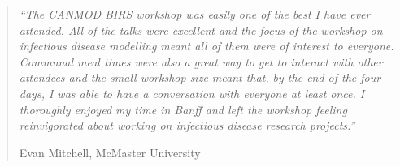\begin{quote}
\textit{``The CANMOD BIRS workshop was easily one of the best I have ever attended. All of the talks were excellent and the focus of the workshop on infectious disease modelling meant all of them were of interest to everyone. Communal meal times were also a great way to get to interact with other attendees and the small workshop size meant that, by the end of the four days, I was able to have a conversation with everyone at least once. I thoroughly enjoyed my time in Banff and left the workshop feeling reinvigorated about working on infectious disease research projects.''}

\hfill Evan Mitchell, McMaster University
\end{quote}